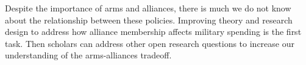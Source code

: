 \documentclass[12pt]{article}
\begin{document}
Despite the importance of arms and alliances, there is much we do not know about the relationship between these policies. Improving theory and research design to address how alliance membership affects military spending is the first task. Then scholars can address other open research questions to increase our understanding of the arms-alliances tradeoff.  




%  
 
\end{document}
